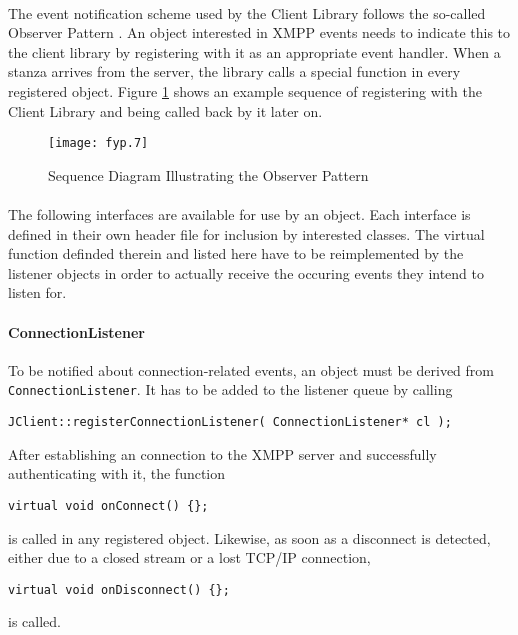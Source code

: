\paragraph{}
The event notification scheme used by the Client Library follows the so-called Observer Pattern \cite{wikipedia003}. An object interested in XMPP events needs to indicate this to the client library by registering with it as an appropriate event handler. When a stanza arrives from the server, the library calls a special function in every registered object. Figure \ref{fig:observer1} shows an example sequence of registering with the Client Library and being called back by it later on.

\begin{figure}[H]
\begin{center}
\texttt{[image: fyp.7]}
\end{center}
\caption{Sequence Diagram Illustrating the Observer Pattern}
\label{fig:observer1}
\end{figure}
\paragraph{}
The following interfaces are available for use by an object. Each interface is defined in their own header file for inclusion by interested classes. The virtual function definded therein and listed here have to be reimplemented by the listener objects in order to actually receive the occuring events they intend to listen for.

\paragraph{ConnectionListener}
To be notified about connection-related events, an object must be derived from \texttt{ConnectionListener}. It has to be added to the listener queue by calling
\begin{flushleft}
\texttt{JClient::registerConnectionListener( ConnectionListener* cl );}
\end{flushleft}
After establishing an connection to the XMPP server and successfully authenticating with it, the function
\begin{flushleft}
\texttt{virtual void onConnect() \{\};}
\end{flushleft}
is called in any registered object. Likewise, as soon as a disconnect is detected, either due to a closed stream or a lost TCP/IP connection, 
\begin{flushleft}
\texttt{virtual void onDisconnect() \{\};}
\end{flushleft}
is called.

